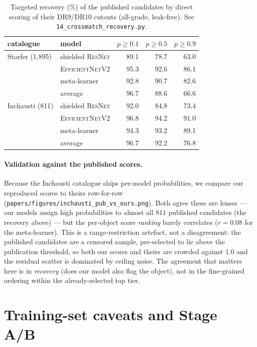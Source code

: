 \documentclass[11pt,letterpaper]{article}
\newcommand{\ResNet}{\textsc{ResNet}}
\newcommand{\EffNet}{\textsc{EfficientNetV2}}
\newcommand{\rInchaustiCorr}{0.08}   %
\begin{document}
\begin{table}[htbp]
\centering
\begin{tabular}{llrrr}
\toprule
catalogue & model & $p\ge0.1$ & $p\ge0.5$ & $p\ge0.9$ \\
\midrule
Storfer (1,895) & shielded \ResNet & 89.1 & 78.7 & 63.0 \\
                & \EffNet          & 95.3 & 92.6 & 86.1 \\
                & meta-learner     & 92.8 & 90.7 & 82.6 \\
                & average          & 96.7 & 88.6 & 66.6 \\
\midrule
Inchausti (811) & shielded \ResNet & 92.0 & 84.8 & 73.4 \\
                & \EffNet          & 96.8 & 94.2 & 91.0 \\
                & meta-learner     & 94.3 & 93.2 & 89.1 \\
                & average          & 96.7 & 92.2 & 76.8 \\
\bottomrule
\end{tabular}
\caption{Targeted recovery (\%) of the published candidates by direct scoring of
their DR9/DR10 cutouts (all-grade, leak-free). See
\texttt{14\_crossmatch\_recovery.py}.}
\label{tab:recovery}
\end{table}

\paragraph{Validation against the published scores.} Because the Inchausti
catalogue ships per-model probabilities, we compare our reproduced scores to
theirs row-for-row (\texttt{papers/figures/inchausti\_pub\_vs\_ours.png}). Both
agree these are lenses --- our models assign high probabilities to almost all
$811$ published candidates (the recovery above) --- but the per-object score
\emph{ranking} barely correlates ($r=\rInchaustiCorr{}$ for the meta-learner).
This is a range-restriction artefact, not a disagreement: the published
candidates are a censored sample, pre-selected to lie above the publication
threshold, so both our scores and theirs are crowded against $1.0$ and the
residual scatter is dominated by ceiling noise. The agreement that matters here
is in \emph{recovery} (does our model also flag the object), not in the
fine-grained ordering within the already-selected top tier.

\section{Training-set caveats and Stage A/B}
\label{sec:caveats}
\end{document}
